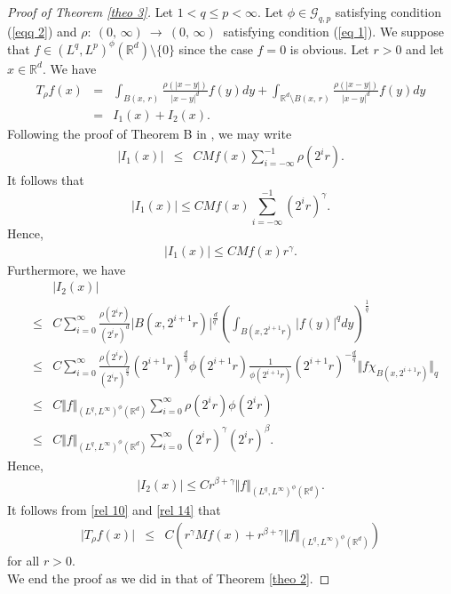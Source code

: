 \documentclass[a4paper,12pt,intlimits,oneside]{amsart}
\numberwithin{equation}{section}
\numberwithin{equation}{section}
\theoremstyle{definition}
\begin{document}
\begin{proof}[Proof of Theorem \ref{theo 3}]
Let $1 < q\leq p < \infty$. Let $\phi\in \mathcal{G}_{q,p}$ satisfying condition (\ref{eqq 2}) and $\rho : \: (0,\,\infty) \:  \to \: (0,\,\infty) \:$ satisfying condition (\ref{eq 1}). We suppose that $f \in (L^{q},L^{p})^{\phi}(\mathbb{R}^{d})\setminus \{ 0 \}$ since the case $f=0$ is obvious. Let $r>0$ and let $x \in \mathbb{R}^{d}$. We have
\begin{eqnarray*}
T_{\rho} f(x)&=&\displaystyle\int_{B(x,\, r)}\frac{\rho(\left|x-y\right|)}{\left|x-y\right|^{d}}f(y)dy+\displaystyle\int_{\mathbb{R}^{d}\setminus B(x,\, r)}\frac{\rho(\left|x-y\right|)}{\left|x-y\right|^{d}}f(y)dy \\ &=& I_{1}(x) + I_{2}(x) . 
\end{eqnarray*}
Following the proof of Theorem B in \cite{GE0}, we may write
\begin{eqnarray*} 
 \vert I_{1}(x) \vert & \leq &  C M f(x) \sum\limits^{-1}_{i=-\infty}  \rho(2^{i}r).
\end{eqnarray*}
It follows that $$\vert I_{1}(x) \vert  \leq  C M f(x) \sum\limits^{-1}_{i=-\infty}  (2^{i}r)^{\gamma}. $$ 
Hence, \begin{eqnarray} \label{rel 10}
\vert I_{1}(x) \vert  \leq C   M f(x)r^{\gamma}.
\end{eqnarray}
Furthermore, we have
\begin{eqnarray*}
& &\vert I_{2}(x) \vert  \\
& \leq & C\sum\limits^{\infty}_{i=0}\frac{\rho(2^{i}r)}{(2^{i}r)^{d}} \vert B(x,2^{i+1}r) \vert^{\frac{d}{q'}} \left( \displaystyle\int_{B(x,2^{i+1}r)} \vert f(y)\vert^{q} dy\right)^{\frac{1}{q}}\\
 &\leq & C \sum\limits^{\infty}_{i=0}\frac{\rho(2^{i}r)}{(2^{i}r)^{\frac{d}{q}}} (2^{i+1}r)^{\frac{d}{q}} \phi(2^{i+1}r)\frac{1}{\phi(2^{i+1}r)}(2^{i+1}r)^{-\frac{d}{q}} \Vert f \chi_{B(x,2^{i+1}r)}   \Vert_{q} \\
 &\leq & C \Vert f \Vert_{(L^{q},L^{\infty})^{\phi}(\mathbb{R}^{d})}\sum\limits^{\infty}_{i=0} \rho(2^{i}r) \phi(2^{i}r)\\&\leq & C \Vert f \Vert_{(L^{q},L^{\infty})^{\phi}(\mathbb{R}^{d})}\sum\limits^{\infty}_{i=0} (2^{i}r)^{\gamma} (2^{i}r)^{\beta}.
\end{eqnarray*}
Hence,
\begin{eqnarray}\label{rel 14}
\vert I_{2}(x) \vert \leq C r^{\beta +\gamma}\Vert f \Vert_{(L^{q},L^{\infty})^{\phi}(\mathbb{R}^{d})}.
\end{eqnarray}
It follows from \eqref{rel 10} and \eqref{rel 14} that
\begin{eqnarray*}
\vert T_{\rho} f(x) \vert &\leq& C\left(r^{\gamma} M f(x)+r^{\beta +\gamma}\Vert f \Vert_{(L^{q},L^{\infty})^{\phi}(\mathbb{R}^{d})}\right)
\end{eqnarray*}
for all $ r > 0 $. \\ 
We end the proof as we did in that of Theorem \ref{theo 2}.
\end{proof}
\end{document}
